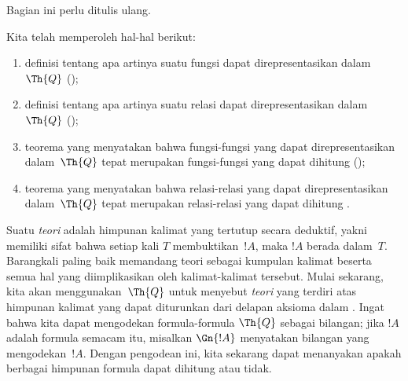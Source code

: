 \documentclass[../../../include/open-logic-section]{subfiles}
\begin{document}


\begin{editorial}
Bagian ini perlu ditulis ulang.
\end{editorial}

Kita telah memperoleh hal-hal berikut:
\begin{enumerate}
\item definisi tentang apa artinya suatu fungsi dapat direpresentasikan
  dalam~$\Th{Q}$ ();
\item definisi tentang apa artinya suatu relasi dapat direpresentasikan
  dalam~$\Th{Q}$ ();
\item teorema yang menyatakan bahwa fungsi-fungsi yang dapat direpresentasikan
  dalam~$\Th{Q}$ tepat merupakan fungsi-fungsi yang dapat dihitung
  ();
\item teorema yang menyatakan bahwa relasi-relasi yang dapat direpresentasikan
  dalam~$\Th{Q}$ tepat merupakan relasi-relasi yang dapat dihitung
  .
\end{enumerate}

Suatu {\em teori} adalah himpunan kalimat yang tertutup secara deduktif,
yakni memiliki sifat bahwa setiap kali $T$ membuktikan~$!A$, maka $!A$ berada
dalam~$T$. Barangkali paling baik memandang teori sebagai kumpulan kalimat
beserta semua hal yang diimplikasikan oleh kalimat-kalimat tersebut. Mulai
sekarang, kita akan menggunakan~$\Th{Q}$ untuk menyebut {\em teori} yang
terdiri atas himpunan kalimat yang dapat diturunkan dari delapan aksioma dalam
. Ingat bahwa kita dapat mengodekan formula-formula
$\Th{Q}$ sebagai bilangan; jika $!A$ adalah formula semacam itu, misalkan
$\Gn{!A}$ menyatakan bilangan yang mengodekan~$!A$. Dengan pengodean ini, kita
sekarang dapat menanyakan apakah berbagai himpunan formula dapat dihitung atau
tidak.
\end{document}
